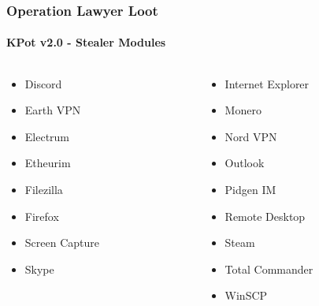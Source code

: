 \documentclass[aspectratio=169]{beamer}
\begin{document}
{
\begin{frame}
  \frametitle{Operation Lawyer Loot}
  \framesubtitle{KPot v2.0 - Stealer Modules}
  \begin{columns}
    \begin{column}{.5\textwidth}
      \begin{itemize}
      \item{Discord}
      \item{Earth VPN}
      \item{Electrum}
      \item{Etheurim}
      \item{Filezilla}
      \item{Firefox}
      \item{Screen Capture}
      \item{Skype}
      \end{itemize}
    \end{column}
    \hfill
    \begin{column}{.5\textwidth}
      \begin{itemize}
      \item{Internet Explorer}
      \item{Monero}
      \item{Nord VPN}
      \item{Outlook}
      \item{Pidgen IM}
      \item{Remote Desktop}
      \item{Steam}
      \item{Total Commander}
      \item{WinSCP}
      \end{itemize}
    \end{column}
  \end{columns}
\end{frame}
}
\end{document}
